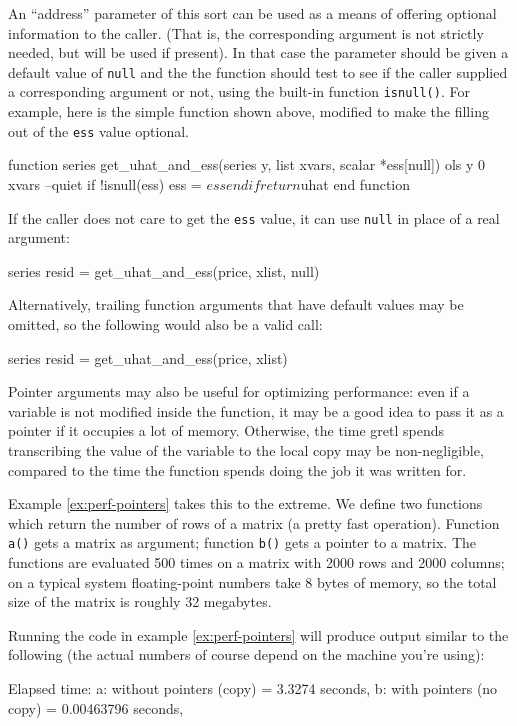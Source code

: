 An ``address'' parameter of this sort can be used as a means of
offering optional information to the caller.  (That is, the
corresponding argument is not strictly needed, but will be used if
present).  In that case the parameter should be given a default value
of \texttt{null} and the the function should test to see if the caller
supplied a corresponding argument or not, using the built-in function
\texttt{isnull()}.  For example, here is the simple function shown
above, modified to make the filling out of the \texttt{ess} value
optional.
%
\begin{code}
function series get_uhat_and_ess(series y, list xvars, scalar *ess[null])
  ols y 0 xvars --quiet
  if !isnull(ess) 
     ess = $ess
  endif
  return $uhat
end function
\end{code}
%
If the caller does not care to get the \texttt{ess} value, it can
use \texttt{null} in place of a real argument:
%
\begin{code}
series resid = get_uhat_and_ess(price, xlist, null)
\end{code}
%
Alternatively, trailing function arguments that have default values 
may be omitted, so the following would also be a valid call:
%
\begin{code}
series resid = get_uhat_and_ess(price, xlist)
\end{code}

Pointer arguments may also be useful for optimizing performance: even if
a variable is not modified inside the function, it may be a good idea
to pass it as a pointer if it occupies a lot of memory. Otherwise, the
time gretl spends transcribing the value of the variable to the
local copy may be non-negligible, compared to the time the function
spends doing the job it was written for.

Example \ref{ex:perf-pointers} takes this to the extreme.  We define
two functions which return the number of rows of a matrix (a pretty
fast operation).  Function \texttt{a()} gets a matrix as argument;
function \texttt{b()} gets a pointer to a matrix.  The functions are
evaluated 500 times on a matrix with 2000 rows and 2000 columns; on a
typical system floating-point numbers take 8 bytes of memory, so the
total size of the matrix is roughly 32 megabytes.

Running the code in example \ref{ex:perf-pointers} will produce output
similar to the following (the actual numbers of course depend on the
machine you're using):
\begin{code}
Elapsed time:
        a: without pointers (copy) = 3.3274 seconds,
        b: with pointers (no copy) = 0.00463796 seconds,
\end{code}

